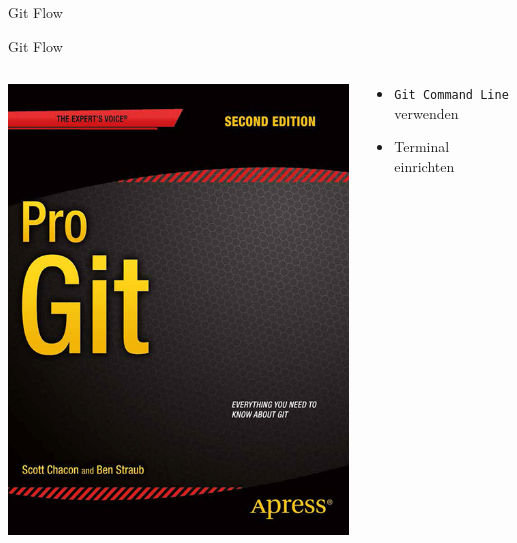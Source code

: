 \documentclass{beamer}
\begin{document}
\begin{frame}{Git Flow}
	\only<1>{
		\resizebox{!}{.6\textheight}{
			
		}
	}
	\only<2>{
		\resizebox{!}{.6\textheight}{
			
		}
	}
\end{frame}

\begin{frame}{Git Flow}
	\begin{columns}[T] %
		\begin{column}{.4\textwidth}
			\begin{center}
				\includegraphics[scale=.2]{progit.png}
			\end{center}
		\end{column}
		\hfill
		\begin{column}{.8\textwidth}
			\vfill
			\begin{itemize}
				\item \texttt{Git Command Line} verwenden
				\item Terminal einrichten

\end{itemize}
\end{column}
\end{columns}
\end{frame}
\end{document}
